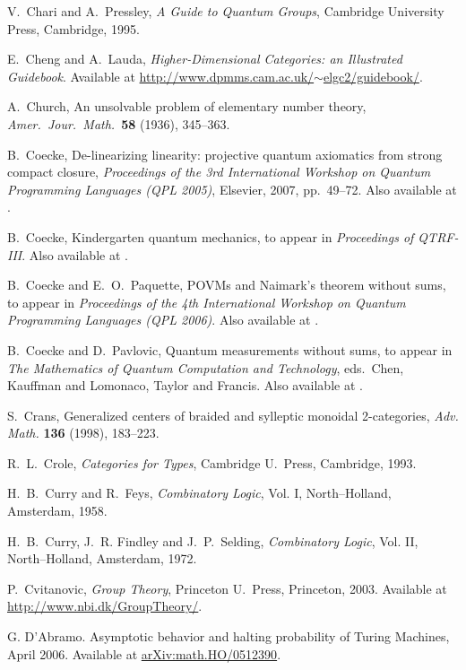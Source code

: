 \documentclass[12pt,twoside,openright]{report}
\begin{document}
\begin{thebibliography}{99}
 V.\ Chari and A.\ Pressley, \textsl{A Guide to Quantum Groups}, Cambridge University Press, Cambridge, 1995.

 E.\ Cheng and A.\ Lauda, \textsl{Higher-Dimensional Categories: an Illustrated Guidebook}.  Available at
\href{http://www.dpmms.cam.ac.uk/~elgc2/guidebook/}
{http://www.dpmms.cam.ac.uk/$\sim$elgc2/guidebook/}.

 A.\ Church, An unsolvable problem of elementary number theory, {\sl Amer.\ Jour.\ Math.\ }{\bf 58} (1936), 345--363.

 B.\ Coecke, De-linearizing linearity: projective quantum axiomatics from strong compact closure, {\sl Proceedings of the 3rd International Workshop on Quantum Programming Languages (QPL 2005)}, Elsevier, 2007, pp.\ 49--72.  Also available at .

 B.\ Coecke, Kindergarten quantum mechanics, to appear in {\sl Proceedings of QTRF-III}.  Also available at
.

 B.\ Coecke and E.\ O.\ Paquette, POVMs and Naimark's theorem without sums, to appear in {\sl Proceedings of the 4th International Workshop on Quantum Programming Languages (QPL 2006)}. Also available at .

 B.\ Coecke and D.\ Pavlovic, Quantum measurements without sums, to appear in {\sl The Mathematics of Quantum Computation and Technology}, eds.\ Chen, Kauffman and Lomonaco, Taylor and Francis. Also available at .

 S.\ Crans, Generalized centers of braided and sylleptic monoidal 2-categories, \textsl{Adv. Math.} \textbf{136} (1998), 183--223.

 R.\ L.\ Crole, {\sl Categories for Types}, Cambridge U.\ Press, Cambridge, 1993.

 H.\ B.\ Curry and R.\ Feys, {\sl Combinatory Logic}, Vol. I, North--Holland, Amsterdam, 1958.

H.\ B.\ Curry, J.\ R. Findley and J.\ P.\ Selding, {\sl Combinatory Logic}, Vol. II, North--Holland, Amsterdam, 1972.

 P.\ Cvitanovic, \textsl{Group Theory}, Princeton U.\ Press, Princeton, 2003.  Available at \hfill \break
\href{http://www.nbi.dk/GroupTheory/}{
http://www.nbi.dk/GroupTheory/}.

 G. D'Abramo. Asymptotic behavior and halting probability of Turing Machines, April 2006.  Available at \href{http://arxiv.org/abs/math/0512390}{arXiv:math.HO/0512390}.


\end{thebibliography}
\end{document}
